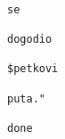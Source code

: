 \documentclass{exam}
\begin{document}
\begin{itemize}
\begin{lstlisting}
                                                                                                                                se
                                                                                                                                dogodio
                                                                                                                                $petkovi
                                                                                                                                puta."
                                                                                                                                done
                                                                                                \end{lstlisting}
                                                                                            \end{itemize}
\end{document}
